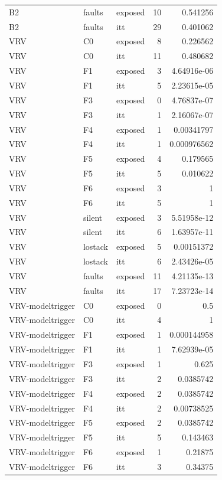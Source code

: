 \begin{tabular}{lllrr}
B2 & faults & exposed & 10 & 0.541256 \\
B2 & faults & itt & 29 & 0.401062 \\
VRV & C0 & exposed & 8 & 0.226562 \\
VRV & C0 & itt & 11 & 0.480682 \\
VRV & F1 & exposed & 3 & 4.64916e-06 \\
VRV & F1 & itt & 5 & 2.23615e-05 \\
VRV & F3 & exposed & 0 & 4.76837e-07 \\
VRV & F3 & itt & 1 & 2.16067e-07 \\
VRV & F4 & exposed & 1 & 0.00341797 \\
VRV & F4 & itt & 1 & 0.000976562 \\
VRV & F5 & exposed & 4 & 0.179565 \\
VRV & F5 & itt & 5 & 0.010622 \\
VRV & F6 & exposed & 3 & 1 \\
VRV & F6 & itt & 5 & 1 \\
VRV & silent & exposed & 3 & 5.51958e-12 \\
VRV & silent & itt & 6 & 1.63957e-11 \\
VRV & lostack & exposed & 5 & 0.00151372 \\
VRV & lostack & itt & 6 & 2.43426e-05 \\
VRV & faults & exposed & 11 & 4.21135e-13 \\
VRV & faults & itt & 17 & 7.23723e-14 \\
VRV-modeltrigger & C0 & exposed & 0 & 0.5 \\
VRV-modeltrigger & C0 & itt & 4 & 1 \\
VRV-modeltrigger & F1 & exposed & 1 & 0.000144958 \\
VRV-modeltrigger & F1 & itt & 1 & 7.62939e-05 \\
VRV-modeltrigger & F3 & exposed & 1 & 0.625 \\
VRV-modeltrigger & F3 & itt & 2 & 0.0385742 \\
VRV-modeltrigger & F4 & exposed & 2 & 0.0385742 \\
VRV-modeltrigger & F4 & itt & 2 & 0.00738525 \\
VRV-modeltrigger & F5 & exposed & 2 & 0.0385742 \\
VRV-modeltrigger & F5 & itt & 5 & 0.143463 \\
VRV-modeltrigger & F6 & exposed & 1 & 0.21875 \\
VRV-modeltrigger & F6 & itt & 3 & 0.34375 \\

\end{tabular}
